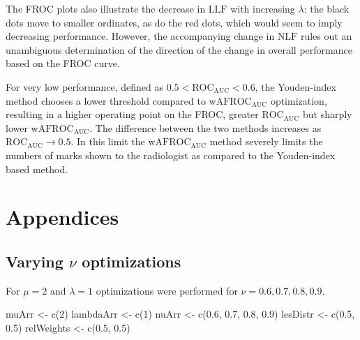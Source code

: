 \documentclass[
]{book}
\newenvironment{Shaded}{\begin{snugshade}}{\end{snugshade}}
\newcommand{\DecValTok}[1]{\textcolor[rgb]{0.00,0.00,0.81}{#1}}
\newcommand{\FloatTok}[1]{\textcolor[rgb]{0.00,0.00,0.81}{#1}}
\newcommand{\FunctionTok}[1]{\textcolor[rgb]{0.00,0.00,0.00}{#1}}
\newcommand{\NormalTok}[1]{#1}
\newcommand{\OtherTok}[1]{\textcolor[rgb]{0.56,0.35,0.01}{#1}}
\begin{document}
The FROC plots also illustrate the decrease in \(\text{LLF}\) with increasing \(\lambda\): the black dots move to smaller ordinates, as do the red dots, which would seem to imply decreasing performance. However, the accompanying change in \(\text{NLF}\) rules out an unambiguous determination of the direction of the change in overall performance based on the FROC curve.

For very low performance, defined as \(0.5 < \text{ROC}_\text{AUC} < 0.6\), the Youden-index method chooses a lower threshold compared to \(\text{wAFROC}_\text{AUC}\) optimization, resulting in a higher operating point on the FROC, greater \(\text{ROC}_\text{AUC}\) but sharply lower \(\text{wAFROC}_\text{AUC}\). The difference between the two methods increases as \(\text{ROC}_\text{AUC} \rightarrow 0.5\). In this limit the \(\text{wAFROC}_\text{AUC}\) method severely limits the numbers of marks shown to the radiologist as compared to the Youden-index based method.

\hypertarget{cad-optim-op-appendices}{%
\section{Appendices}\label{cad-optim-op-appendices}}

\hypertarget{optim-op-point-vary-nu}{%
\subsection{\texorpdfstring{Varying \(\nu\) optimizations}{Varying \textbackslash nu optimizations}}\label{optim-op-point-vary-nu}}

For \(\mu = 2\) and \(\lambda = 1\) optimizations were performed for \(\nu = 0.6, 0.7, 0.8, 0.9\).

\begin{Shaded}
\begin{Highlighting}[]
\NormalTok{muArr }\OtherTok{\textless{}{-}} \FunctionTok{c}\NormalTok{(}\DecValTok{2}\NormalTok{)}
\NormalTok{lambdaArr }\OtherTok{\textless{}{-}} \FunctionTok{c}\NormalTok{(}\DecValTok{1}\NormalTok{)}
\NormalTok{nuArr }\OtherTok{\textless{}{-}} \FunctionTok{c}\NormalTok{(}\FloatTok{0.6}\NormalTok{, }\FloatTok{0.7}\NormalTok{, }\FloatTok{0.8}\NormalTok{, }\FloatTok{0.9}\NormalTok{)}
\NormalTok{lesDistr }\OtherTok{\textless{}{-}} \FunctionTok{c}\NormalTok{(}\FloatTok{0.5}\NormalTok{, }\FloatTok{0.5}\NormalTok{)}
\NormalTok{relWeights }\OtherTok{\textless{}{-}} \FunctionTok{c}\NormalTok{(}\FloatTok{0.5}\NormalTok{, }\FloatTok{0.5}\NormalTok{)}
\end{Highlighting}
\end{Shaded}
\end{document}
